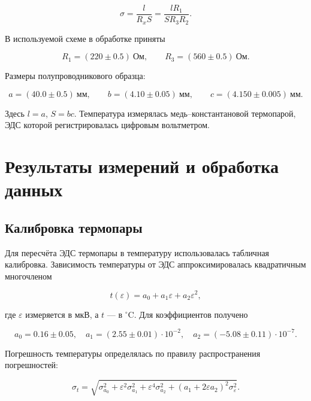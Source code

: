 \documentclass[a4paper,12pt]{article}
\begin{document}
\begin{equation}
    \sigma = \frac{l}{R_x S} = \frac{lR_1}{SR_3R_2}.
\end{equation}

В используемой схеме в обработке приняты

\begin{equation}
    R_1 = (220 \pm 0.5)~\text{Ом}, \qquad
    R_3 = (560 \pm 0.5)~\text{Ом}.
\end{equation}

Размеры полупроводникового образца:

\begin{equation}
    a = (40.0 \pm 0.5)~\text{мм}, \qquad
    b = (4.10 \pm 0.05)~\text{мм}, \qquad
    c = (4.150 \pm 0.005)~\text{мм}.
\end{equation}

Здесь $l = a$, $S = bc$. Температура измерялась медь--константановой термопарой, ЭДС которой регистрировалась цифровым вольтметром.

\section{Результаты измерений и обработка данных}

\subsection*{Калибровка термопары}

Для пересчёта ЭДС термопары в температуру использовалась табличная калибровка. Зависимость температуры от ЭДС аппроксимировалась квадратичным многочленом

\begin{equation}
    t(\varepsilon) = a_0 + a_1 \varepsilon + a_2 \varepsilon^2,
    \label{eq:thermopair}
\end{equation}

где $\varepsilon$ измеряется в мкВ, а $t$ --- в $^\circ$C. Для коэффициентов получено

\begin{equation}
    a_0 = 0.16 \pm 0.05, \quad
    a_1 = (2.55 \pm 0.01)\cdot 10^{-2}, \quad
    a_2 = (-5.08 \pm 0.11)\cdot 10^{-7}.
\end{equation}

Погрешность температуры определялась по правилу распространения погрешностей:

\begin{equation}
    \sigma_t = \sqrt{ \sigma_{a_0}^2 + \varepsilon^2 \sigma_{a_1}^2 + \varepsilon^4 \sigma_{a_2}^2 + \left(a_1 + 2 \varepsilon a_2 \right)^2 \sigma_\varepsilon^2 }.
\end{equation}
\end{document}
